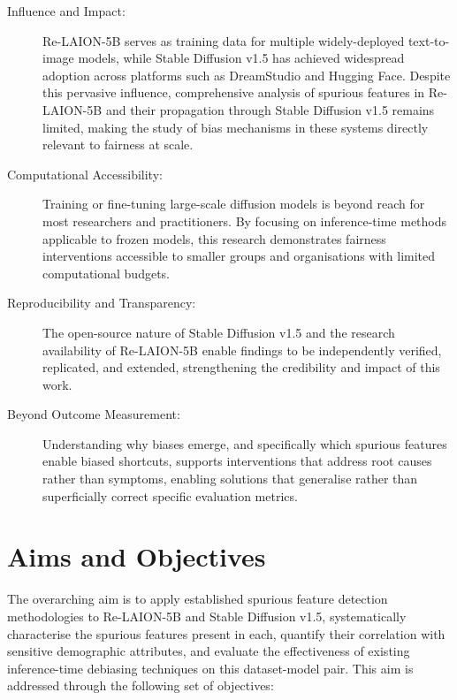 \begin{description}
	\item[Influence and Impact:] Re-LAION-5B serves as training data for multiple widely-deployed
	text-to-image models, while Stable Diffusion v1.5 has achieved widespread adoption across
	platforms such as DreamStudio and Hugging Face. Despite this pervasive influence,
	comprehensive analysis of spurious features in Re-LAION-5B and their propagation through
	Stable Diffusion v1.5 remains limited, making the study of bias mechanisms in these systems
	directly relevant to fairness at scale.
	
	\item[Computational Accessibility:] Training or fine-tuning large-scale diffusion models is beyond
	reach for most researchers and practitioners. By focusing on inference-time methods
	applicable to frozen models, this research demonstrates fairness interventions accessible to
	smaller groups and organisations with limited computational budgets.
	
	\item[Reproducibility and Transparency:] The open-source nature of Stable Diffusion v1.5 and the
	research availability of Re-LAION-5B enable findings to be independently verified,
	replicated, and extended, strengthening the credibility and impact of this work.
	
	\item[Beyond Outcome Measurement:] Understanding why biases emerge, and specifically which spurious features enable biased shortcuts, supports interventions that address root causes
	rather than symptoms, enabling solutions that generalise rather than superficially correct
	specific evaluation metrics.
\end{description}

\section{Aims and Objectives}

The overarching aim is to apply established spurious feature detection methodologies to
Re-LAION-5B and Stable Diffusion v1.5, systematically characterise the spurious features
present in each, quantify their correlation with sensitive demographic attributes, and
evaluate the effectiveness of existing inference-time debiasing techniques on this
dataset-model pair. This aim is addressed through the following set of objectives:

